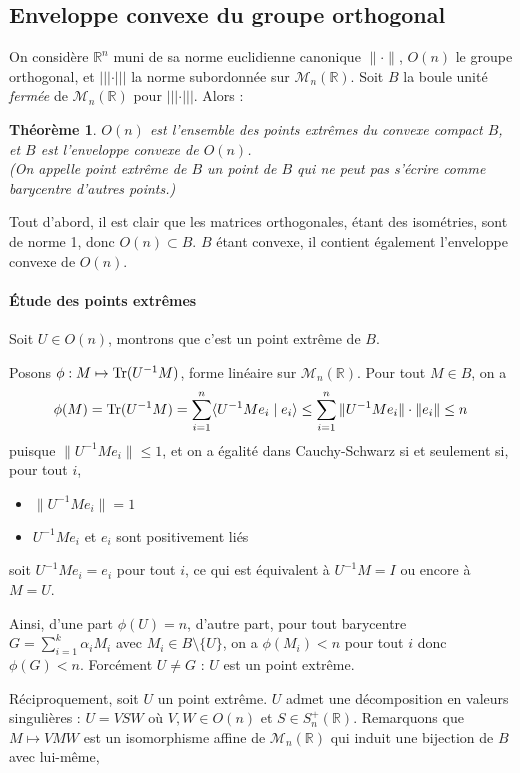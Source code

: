 \documentclass[a4paper, 11pt]{article}
\def\R{\mathbb{R}}
\def\M{\mathcal{M}}
\def\Tr{\textnormal{Tr}}
\newtheorem*{theorem}{Théorème}
\begin{document}
\subsection{Enveloppe convexe du groupe orthogonal}

On considère $\R^n$ muni de sa norme euclidienne canonique $\|\cdot\|$, $O(n)$
le groupe orthogonal, et $||| \cdot |||$ la norme subordonnée sur $\M_n(\R)$.
Soit $B$ la boule unité \emph{fermée} de $\M_n(\R)$ pour $||| \cdot |||$.
Alors :

\begin{theorem}
  $O(n)$ est l'ensemble des points extrêmes du convexe compact $B$, et $B$ est
  l'enveloppe convexe de $O(n)$.\\
  (On appelle \emph{point extrême} de $B$ un point de $B$ qui ne peut pas s'écrire
  comme barycentre d'autres points.)
\end{theorem}

Tout d'abord, il est clair que les matrices orthogonales, étant des isométries,
sont de norme 1, donc $O(n) \subset B$. $B$ étant convexe, il contient également
l'enveloppe convexe de $O(n)$.

\paragraph{Étude des points extrêmes} Soit $U \in O(n)$, montrons que c'est un
point extrême de $B$.

Posons $\phi : M \mapsto \Tr(U^{-1}M)$, forme linéaire sur $\M_n(\R)$. Pour tout
$M \in B$, on a
\[ \phi(M) = \Tr(U^{-1}M) = \sum_{i=1}^n \langle U^{-1}M e_i \mid e_i \rangle
\leq \sum_{i=1}^n \| U^{-1}M e_i \| \cdot \| e_i \| \leq n \]
puisque $\| U^{-1}M e_i \| \leq 1$, et on a égalité dans Cauchy-Schwarz si et
seulement si, pour tout $i$,
\begin{itemize}
\item $\| U^{-1}M e_i \| = 1$
\item $U^{-1}M e_i$ et $e_i$ sont positivement liés
\end{itemize}
soit $U^{-1}M e_i = e_i$ pour tout $i$, ce qui est équivalent à $U^{-1}M = I$ ou
encore à $M = U$.

Ainsi, d'une part $\phi(U) = n$, d'autre part, pour tout barycentre $G =
\sum_{i=1}^k \alpha_i M_i$ avec $M_i \in B \setminus \{U\}$, on a $\phi(M_i) <
n$ pour tout $i$ donc $\phi(G) < n$. Forcément $U \neq G$ : $U$ est un point
extrême.

Réciproquement, soit $U$ un point extrême. $U$ admet une décomposition en
valeurs singulières : $U = VSW$ où $V, W \in O(n)$ et $S \in S_n^+(\R)$.
Remarquons que $M \mapsto VMW$ est un isomorphisme affine de $\M_n(\R)$ qui
induit une bijection de $B$ avec lui-même,
\end{document}
